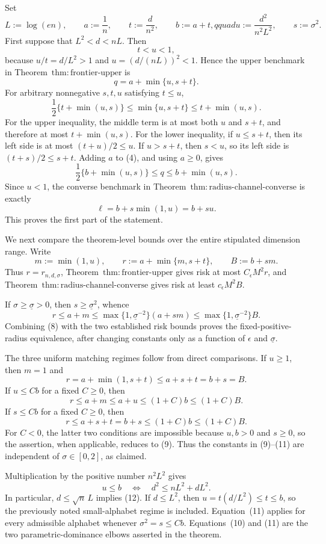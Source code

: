 Set
\[
 L:=\log(en),\qquad a:=\frac1n,\qquad t:=\frac d{n^2},
 \qquad b:=a+t,qquad u:=\frac{d^2}{n^2L^2},
 \qquad s:=\sigma^2.
\tag{1}
\]
First suppose that \(L^2<d<nL\).  Then
\[
 t<u<1,
\tag{2}
\]
because \(u/t=d/L^2>1\) and \(u=(d/(nL))^2<1\).  Hence the upper benchmark in Theorem~\(\mathrm{thm:frontier\text{-}upper}\) is
\[
 q=a+\min\{u,s+t\}.
\tag{3}
\]
For arbitrary nonnegative \(s,t,u\) satisfying \(t\le u\),
\[
 \frac12\{t+\min(u,s)\}
 \le \min\{u,s+t\}
 \le t+\min(u,s).
\tag{4}
\]
For the upper inequality, the middle term is at most both \(u\) and \(s+t\), and therefore at most \(t+\min(u,s)\).  For the lower inequality, if \(u\le s+t\), then its left side is at most \((t+u)/2\le u\).  If \(u>s+t\), then \(s<u\), so its left side is \((t+s)/2\le s+t\).  Adding \(a\) to (4), and using \(a\ge0\), gives
\[
 \frac12\{b+\min(u,s)\}
 \le q\le b+\min(u,s).
\tag{5}
\]
Since \(u<1\), the converse benchmark in Theorem~\(\mathrm{thm:radius\text{-}channel\text{-}converse}\) is exactly
\[
 \ell=b+s\min(1,u)=b+su.
\tag{6}
\]
This proves the first part of the statement.

We next compare the theorem-level bounds over the entire stipulated dimension range.  Write
\[
 m:=\min(1,u),\qquad
 r:=a+\min\{m,s+t\},\qquad
 B:=b+sm.
\tag{7}
\]
Thus \(r=r_{n,d,\sigma}\), Theorem~\(\mathrm{thm:frontier\text{-}upper}\) gives risk at most \(C_{\epsilon}M^2r\), and Theorem~\(\mathrm{thm:radius\text{-}channel\text{-}converse}\) gives risk at least \(c_{\epsilon}M^2B\).

If \(\sigma\ge\underline\sigma>0\), then \(s\ge\underline\sigma^2\), whence
\[
 r\le a+m
 \le \max\{1,\underline\sigma^{-2}\}(a+sm)
 \le \max\{1,\underline\sigma^{-2}\}B.
\tag{8}
\]
Combining (8) with the two established risk bounds proves the fixed-positive-radius equivalence, after changing constants only as a function of \(\epsilon\) and \(\underline\sigma\).

The three uniform matching regimes follow from direct comparisons.  If \(u\ge1\), then \(m=1\) and
\[
 r=a+\min(1,s+t)\le a+s+t=b+s=B.
\tag{9}
\]
If \(u\le Cb\) for a fixed \(C\ge0\), then
\[
 r\le a+m\le a+u\le(1+C)b\le(1+C)B.
\tag{10}
\]
If \(s\le Cb\) for a fixed \(C\ge0\), then
\[
 r\le a+s+t=b+s\le(1+C)b\le(1+C)B.
\tag{11}
\]
For \(C<0\), the latter two conditions are impossible because \(u,b>0\) and \(s\ge0\), so the assertion, when applicable, reduces to (9).  Thus the constants in (9)--(11) are independent of \(\sigma\in[0,2]\), as claimed.

Multiplication by the positive number \(n^2L^2\) gives
\[
 u\le b
 \quad\Longleftrightarrow\quad
 d^2\le nL^2+dL^2.
\tag{12}
\]
In particular, \(d\le\sqrt n\,L\) implies (12).  If \(d\le L^2\), then \(u=t(d/L^2)\le t\le b\), so the previously noted small-alphabet regime is included.  Equation~(11) applies for every admissible alphabet whenever \(\sigma^2=s\le Cb\).  Equations~(10) and (11) are the two parametric-dominance elbows asserted in the theorem.

